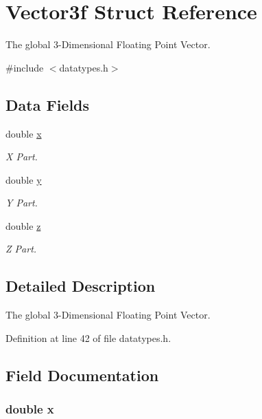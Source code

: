 \hypertarget{struct_vector3f}{\section{Vector3f Struct Reference}
\label{struct_vector3f}
}


The global 3-\/\-Dimensional Floating Point Vector.  




{\ttfamily \#include $<$datatypes.\-h$>$}

\subsection*{Data Fields}
\begin{DoxyCompactItemize}
\item 
double \hyperlink{struct_vector3f_af88b946fb90d5f08b5fb740c70e98c10}{x}
\begin{DoxyCompactList}\small\item\em X Part. \end{DoxyCompactList}\item 
double \hyperlink{struct_vector3f_ab927965981178aa1fba979a37168db2a}{y}
\begin{DoxyCompactList}\small\item\em Y Part. \end{DoxyCompactList}\item 
double \hyperlink{struct_vector3f_ab3e6ed577a7c669c19de1f9c1b46c872}{z}
\begin{DoxyCompactList}\small\item\em Z Part. \end{DoxyCompactList}\end{DoxyCompactItemize}


\subsection{Detailed Description}
The global 3-\/\-Dimensional Floating Point Vector. 



Definition at line 42 of file datatypes.\-h.



\subsection{Field Documentation}
\hypertarget{struct_vector3f_af88b946fb90d5f08b5fb740c70e98c10}{
\subsubsection[{x}]{\setlength{\rightskip}{0pt plus 5cm}double x}}\label{struct_vector3f_af88b946fb90d5f08b5fb740c70e98c10}


